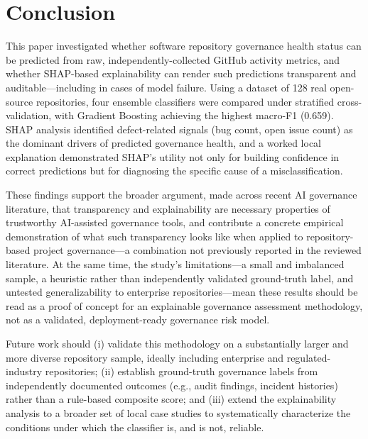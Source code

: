 \documentclass[conference]{IEEEtran}
\begin{document}
\section{Conclusion}

This paper investigated whether software repository governance health status can be
predicted from raw, independently-collected GitHub activity metrics, and whether
SHAP-based explainability can render such predictions transparent and auditable---including
in cases of model failure. Using a dataset of 128 real open-source repositories, four
ensemble classifiers were compared under stratified cross-validation, with Gradient
Boosting achieving the highest macro-F1 (0.659). SHAP analysis identified defect-related
signals (bug count, open issue count) as the dominant drivers of predicted governance
health, and a worked local explanation demonstrated SHAP's utility not only for building
confidence in correct predictions but for diagnosing the specific cause of a
misclassification.

These findings support the broader argument, made across recent AI governance
literature, that transparency and explainability are necessary properties of trustworthy
AI-assisted governance tools, and contribute a concrete empirical demonstration of what
such transparency looks like when applied to repository-based project governance---a
combination not previously reported in the reviewed literature. At the same time, the
study's limitations---a small and imbalanced sample, a heuristic rather than
independently validated ground-truth label, and untested generalizability to enterprise
repositories---mean these results should be read as a proof of concept for an
explainable governance assessment methodology, not as a validated, deployment-ready
governance risk model.

Future work should (i) validate this methodology on a substantially larger and more
diverse repository sample, ideally including enterprise and regulated-industry
repositories; (ii) establish ground-truth governance labels from independently
documented outcomes (e.g., audit findings, incident histories) rather than a rule-based
composite score; and (iii) extend the explainability analysis to a broader set of local
case studies to systematically characterize the conditions under which the classifier
is, and is not, reliable.
\end{document}
